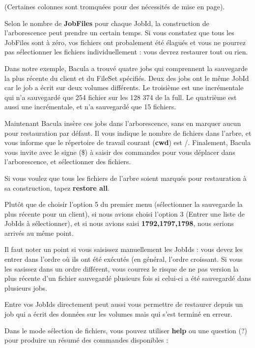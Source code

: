 (Certaines colonnes sont tromqu\'ees pour des n\'ecessit\'es de mise en page).

Selon le nombre de {\bf JobFiles} pour chaque JobId, la construction de 
l'arborescence peut prendre un certain temps. Si vous constatez que tous les 
JobFiles sont \`a z\'ero, vos fichiers ont probalement \'et\'e \'elagu\'es et vous ne 
pourrez pas s\'electionner les fichiers individuellement : vous devrez 
restaurer tout ou rien.

Dans notre exemple, Bacula a trouv\'e quatre jobs qui comprennent la 
sauvegarde la plus r\'ecente du client et du FileSet sp\'ecifi\'es. Deux des jobs 
ont le m\^eme JobId car le job a \'ecrit sur deux volumes diff\'erents. Le 
troisi\`eme est une incr\'ementale qui n'a sauvegard\'e que 254 fichier sur les 
128 374 de la full. Le quatri\`eme est aussi une incr\'ementale, et n'a sauvegard\'e 
que 15 fichiers. 

Maintenant Bacula ins\`ere ces jobs dans l'arborescence, sans en marquer aucun 
pour restauration par d\'efaut. Il vous indique le nombre de fichiers dans 
l'arbre, et vous informe que le r\'epertoire de travail courant ({\bf cwd}) est 
/. Finalement, Bacula vous invite avec le signe (\$) \`a saisir des commandes 
pour vous d\'eplacer dans l'arborescence, et s\'electionner des fichiers.

Si vous voulez que tous les fichiers de l'arbre soient marqu\'es pour 
restauration \`a sa construction, tapez {\bf restore all}.

Plut\^ot que de choisir l'option 5 du premier menu (s\'electionner la 
sauvegarde la plus r\'ecente pour un client), si nous avions choisi l'option 3 
(Entrer une liste de JobIds \`a s\'electionner), et si nous avions saisi 
{\bf 1792,1797,1798}, nous serions arriv\'es au m\^eme point. 
             
Il faut noter un point si vous saisissez manuellement les JobIds : vous devez 
les entrer dans l'ordre o\`u ils ont \'et\'e ex\'ecut\'es (en g\'en\'eral, l'ordre croissant. 
Si vous les sasissez dans un ordre diff\'erent, vous courrez le risque de ne pas 
version la plus r\'ecente d'un fichier sauvegard\'e plusieurs fois si celui-ci a \'et\'e 
sauvegard\'e dans plusieurs jobs.

Entre vos JobIds directement peut aussi vous permettre de restaurer depuis 
un job qui a \'ecrit des donn\'ees sur les volumes mais qui s'est termin\'e en erreur.

Dans le mode s\'election de fichiers, vous pouvez utiliser {\bf help} ou une 
question (?) pour produire un r\'esum\'e des commandes disponibles :

